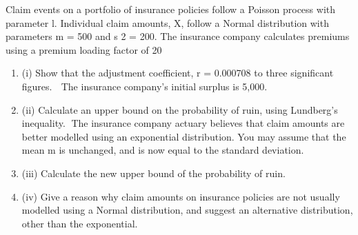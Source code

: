 \documentclass[a4paper,12pt]{article}
\begin{document}
 

Claim events on a portfolio of insurance policies follow a Poisson process with
parameter l. Individual claim amounts, X, follow a Normal distribution with
parameters m = 500 and s 2 = 200.
The insurance company calculates premiums using a premium loading factor of 20%
\begin{enumerate}
    \item (i)
Show that the adjustment coefficient, r = 0.000708 to three significant figures.

The insurance company’s initial surplus is 5,000.
    \item (ii)
Calculate an upper bound on the probability of ruin, using Lundberg’s
inequality.
The insurance company actuary believes that claim amounts are better modelled using
an exponential distribution. You may assume that the mean m is unchanged, and is
now equal to the standard deviation.
    \item (iii) Calculate the new upper bound of the probability of ruin.
    \item (iv) Give a reason why claim amounts on insurance policies are not usually
modelled using a Normal distribution, and suggest an alternative distribution,
other than the exponential.
\end{enumerate}
\end{document}
